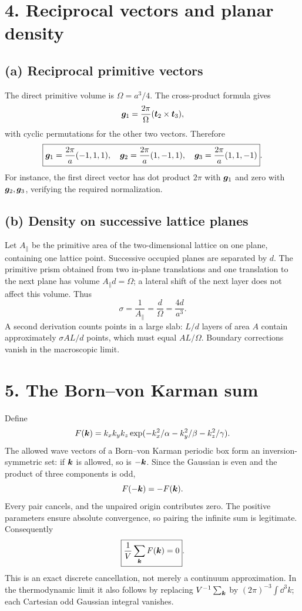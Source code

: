 \section*{4. Reciprocal vectors and planar density}
\subsection*{(a) Reciprocal primitive vectors}
The direct primitive volume is $\Omega=a^3/4$. The cross-product formula gives
\[
\boldsymbol{g}_1=\frac{2\pi}{\Omega}(\boldsymbol{t}_2\times\boldsymbol{t}_3),
\]
with cyclic permutations for the other two vectors. Therefore
\[
\boxed{\boldsymbol{g}_1=\frac{2\pi}{a}(-1,1,1),\quad
\boldsymbol{g}_2=\frac{2\pi}{a}(1,-1,1),\quad
\boldsymbol{g}_3=\frac{2\pi}{a}(1,1,-1)}.
\]
For instance, the first direct vector has dot product $2\pi$ with $\boldsymbol{g}_1$ and zero with $\boldsymbol{g}_2,\boldsymbol{g}_3$, verifying the required normalization.

\subsection*{(b) Density on successive lattice planes}
Let $A_{\parallel}$ be the primitive area of the two-dimensional lattice on one plane, containing one lattice point. Successive occupied planes are separated by $d$. The primitive prism obtained from two in-plane translations and one translation to the next plane has volume $A_{\parallel}d=\Omega$; a lateral shift of the next layer does not affect this volume. Thus
\[
\boxed{\sigma=\frac1{A_{\parallel}}=\frac d\Omega=\frac{4d}{a^3}}.
\]
A second derivation counts points in a large slab: $L/d$ layers of area $A$ contain approximately $\sigma A L/d$ points, which must equal $AL/\Omega$. Boundary corrections vanish in the macroscopic limit.

\section*{5. The Born--von Karman sum}
Define
\[
F(\boldsymbol{k})=k_xk_yk_z\exp(-k_x^2/\alpha-k_y^2/\beta-k_z^2/\gamma).
\]
The allowed wave vectors of a Born--von Karman periodic box form an inversion-symmetric set: if $\boldsymbol{k}$ is allowed, so is $-\boldsymbol{k}$. Since the Gaussian is even and the product of three components is odd,
\[
F(-\boldsymbol{k})=-F(\boldsymbol{k}).
\]
Every pair cancels, and the unpaired origin contributes zero. The positive parameters ensure absolute convergence, so pairing the infinite sum is legitimate. Consequently
\[
\boxed{\frac1V\sum_{\boldsymbol{k}}F(\boldsymbol{k})=0}.
\]
This is an exact discrete cancellation, not merely a continuum approximation. In the thermodynamic limit it also follows by replacing $V^{-1}\sum_{\boldsymbol{k}}$ by $(2\pi)^{-3}\int\dd^3k$; each Cartesian odd Gaussian integral vanishes.

